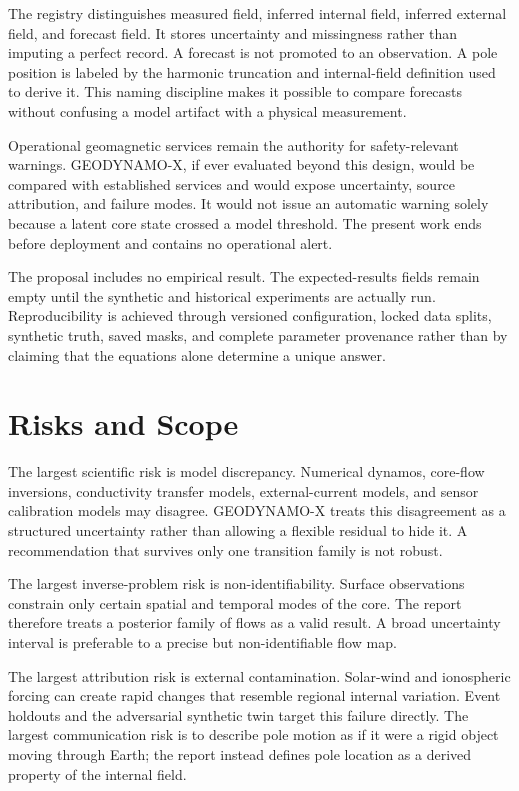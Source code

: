 \documentclass[conference]{IEEEtran}
\begin{document}
The registry distinguishes measured field, inferred internal field, inferred external field, and forecast field. It stores uncertainty and missingness rather than imputing a perfect record. A forecast is not promoted to an observation. A pole position is labeled by the harmonic truncation and internal-field definition used to derive it. This naming discipline makes it possible to compare forecasts without confusing a model artifact with a physical measurement.

Operational geomagnetic services remain the authority for safety-relevant warnings. GEODYNAMO-X, if ever evaluated beyond this design, would be compared with established services and would expose uncertainty, source attribution, and failure modes. It would not issue an automatic warning solely because a latent core state crossed a model threshold. The present work ends before deployment and contains no operational alert.

The proposal includes no empirical result. The expected-results fields remain empty until the synthetic and historical experiments are actually run. Reproducibility is achieved through versioned configuration, locked data splits, synthetic truth, saved masks, and complete parameter provenance rather than by claiming that the equations alone determine a unique answer.

\section{Risks and Scope}
The largest scientific risk is model discrepancy. Numerical dynamos, core-flow inversions, conductivity transfer models, external-current models, and sensor calibration models may disagree. GEODYNAMO-X treats this disagreement as a structured uncertainty rather than allowing a flexible residual to hide it. A recommendation that survives only one transition family is not robust.

The largest inverse-problem risk is non-identifiability. Surface observations constrain only certain spatial and temporal modes of the core. The report therefore treats a posterior family of flows as a valid result. A broad uncertainty interval is preferable to a precise but non-identifiable flow map.

The largest attribution risk is external contamination. Solar-wind and ionospheric forcing can create rapid changes that resemble regional internal variation. Event holdouts and the adversarial synthetic twin target this failure directly. The largest communication risk is to describe pole motion as if it were a rigid object moving through Earth; the report instead defines pole location as a derived property of the internal field.
\end{document}
